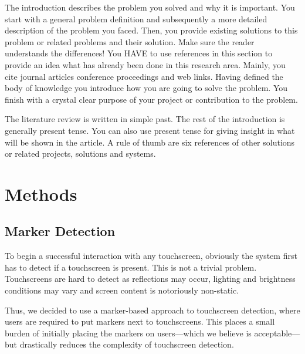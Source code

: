The introduction describes the problem you solved and why it is important. You start with a general problem definition and subsequently a more detailed description of the problem you faced. Then, you provide existing solutions to this problem or related problems and their solution. Make sure the reader understands the differences! You HAVE to use references in this section to provide an idea what has already been done in this research area. Mainly, you cite journal articles 
conference proceedings 
and web links. 
Having defined the body of knowledge you introduce how you are going to solve the problem. You finish with a crystal clear purpose of your project or contribution to the problem.

The literature review is written in simple past. The rest of the introduction is generally present tense. You can also use present tense for giving insight in what will be shown in the article. A rule of thumb are six references of other solutions or related projects, solutions and systems.  

\section{Methods}
\subsection{Marker Detection}
\label{subsec:markers}
To begin a successful interaction with any touchscreen, obviously the system first has to detect if a touchscreen is present.
This is not a trivial problem.
Touchscreens are hard to detect as reflections may occur, lighting and brightness conditions may vary and screen content is notoriously non-static.


Thus, we decided to use a marker-based approach to touchscreen detection, where users are required to put markers next to touchscreens.
This places a small burden of initially placing the markers on users---which we believe is acceptable---but drastically reduces the complexity of touchscreen detection.

